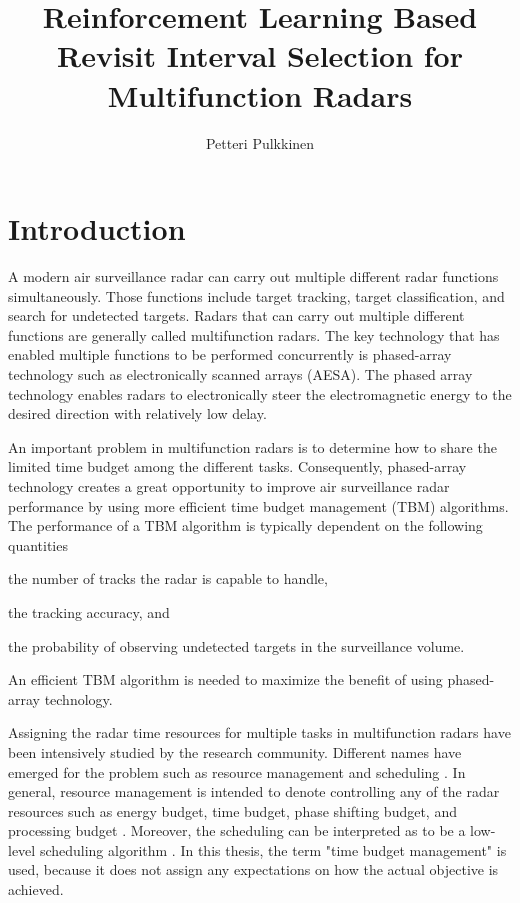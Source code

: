 \documentclass[11pt,a4paper]{article}
\title{Reinforcement Learning Based Revisit Interval Selection for Multifunction Radars}
\author{\large Petteri Pulkkinen}
\begin{document}

\maketitle
\tableofcontents

\newpage
\section{Introduction}

A modern air surveillance radar can carry out multiple different radar functions simultaneously.
Those functions include target tracking, target classification, and search for undetected targets.
Radars that can carry out multiple different functions are generally called multifunction radars.
The key technology that has enabled multiple functions to be performed concurrently is phased-array technology such as
electronically scanned arrays (AESA).
The phased array technology enables radars to electronically steer the electromagnetic energy to the desired direction with relatively low delay.

An important problem in multifunction radars is to determine how to share the limited time budget among the different tasks.
Consequently, phased-array technology creates a great opportunity to improve air surveillance radar performance by using more efficient time budget management (TBM) algorithms.
The performance of a TBM algorithm is typically dependent on the following quantities 
\begin{enumerate*}[label=(\roman*)]
    \item the number of tracks the radar is capable to handle,
    \item the tracking accuracy, and
    \item the probability of observing undetected targets in the surveillance volume.
\end{enumerate*}
An efficient TBM algorithm is needed to maximize the benefit of using phased-array technology.

Assigning the radar time resources for multiple tasks in multifunction radars have been intensively studied by the research community.
Different names have emerged for the problem such as resource management \cite{Wintenby2006, Charlish2015a} and scheduling \cite{Esfahani2012, Byrne2015, Byrne2016, Krishnamurthy1999, Krishnamurthy2001}.
In general, resource management is intended to denote controlling any of the radar resources such as energy budget, time budget, phase shifting budget, and processing budget \cite{Ding2008}.
Moreover, the scheduling can be interpreted as to be a low-level scheduling algorithm \cite{Wintenby2006}.
In this thesis, the term "time budget management" is used, because it does not assign any expectations on how the actual objective is achieved.
\end{document}
